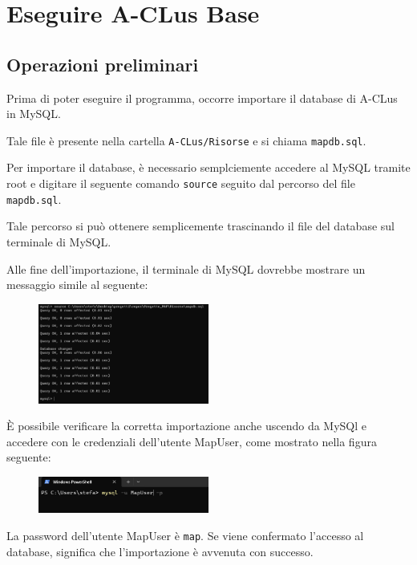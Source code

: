 \section{Eseguire A-CLus Base}

\subsection{Operazioni preliminari}

Prima di poter eseguire il programma, occorre importare il database di A-CLus in MySQL. 

Tale file è presente nella cartella \texttt{A-CLus/Risorse} e si chiama \texttt{mapdb.sql}. 

Per importare il database, è necessario semplciemente accedere al MySQL tramite root e digitare il seguente comando \texttt{source} seguito dal percorso del file \texttt{mapdb.sql}. 

Tale percorso si può ottenere semplicemente trascinando il file del database sul terminale di MySQL.

Alle fine dell'importazione, il terminale di MySQL dovrebbe mostrare un messaggio simile al seguente:

\begin{figure}[h!]
    \centering
    \includegraphics[width=0.5\textwidth]{images/import mysql.png}
\end{figure}

È possibile verificare la corretta importazione anche uscendo da MySQl e accedere con le credenziali dell'utente MapUser, come mostrato nella figura seguente:

\begin{figure}[h!]
    \centering
    \includegraphics[width=0.5\textwidth]{images/import mapdb.png}
\end{figure}

La password dell'utente MapUser è \texttt{map}. Se viene confermato l'accesso al database, significa che l'importazione è avvenuta con successo. 

